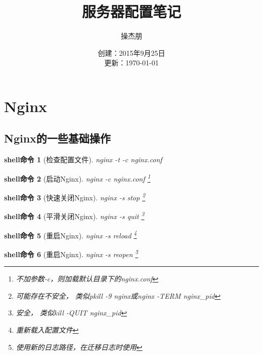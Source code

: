 \documentclass[UTF8]{ctexart}
\title{\heiti 服务器配置笔记}
\author{\kaishu 操杰朋}
\date{创建：2015年9月25日 \\
更新：\today}
\newtheorem{shellcommand}{shell命令}
\begin{document}
\maketitle
\clearpage

\tableofcontents
\clearpage

\section{Nginx}
\subsection{Nginx的一些基础操作}
\begin{shellcommand}[检查配置文件]
  nginx -t -c nginx.conf
\end{shellcommand}

\begin{shellcommand}[启动Nginx]
  nginx -c nginx.conf \footnote{不加参数-c，则加载默认目录下的nginx.conf}
\end{shellcommand}

\begin{shellcommand}[快速关闭Nginx]
  nginx -s stop \footnote{可能存在不安全， 类似pkill -9 nginx或nginx -TERM nginx\_pid}
\end{shellcommand}

\begin{shellcommand}[平滑关闭Nginx]
  nginx -s quit \footnote{安全， 类似kill -QUIT nginx\_pid}
\end{shellcommand}

\begin{shellcommand}[重启Nginx]
  nginx -s reload \footnote{重新载入配置文件}
\end{shellcommand}

\begin{shellcommand}[重启Nginx]
  nginx -s reopen \footnote{使用新的日志路径，在迁移日志时使用}
\end{shellcommand}
\end{document}
